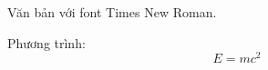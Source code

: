 \documentclass{article}
\begin{document}
	
	Văn bản với font Times New Roman.
	
	Phương trình: 
	\[
	E = mc^2
	\]
	
\end{document}
